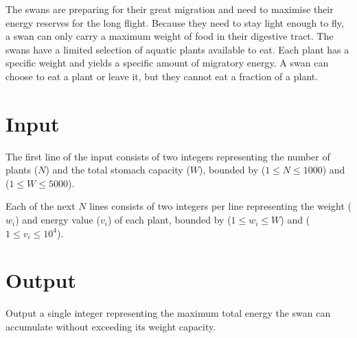 The swans are preparing for their great migration and need to maximise their energy reserves for the long flight.
Because they need to stay light enough to fly, a swan can only carry a maximum weight of food in their digestive tract.
The swans have a limited selection of aquatic plants available to eat.
Each plant has a specific weight and yields a specific amount of migratory energy.
A swan can choose to eat a plant or leave it, but they cannot eat a fraction of a plant.

\section*{Input}
The first line of the input consists of two integers representing the number of plants ($N$) and the total stomach capacity ($W$), bounded by ($1 \le N \le 1000$) and ($1 \le W \le 5000$).

Each of the next $N$ lines consists of two integers per line representing the weight ($w_i$) and energy value ($v_i$) of each plant, bounded by ($1 \le w_i \le W$) and ($1 \le v_i \le 10^4$).

\section*{Output}
Output a single integer representing the maximum total energy the swan can accumulate without exceeding its weight capacity.